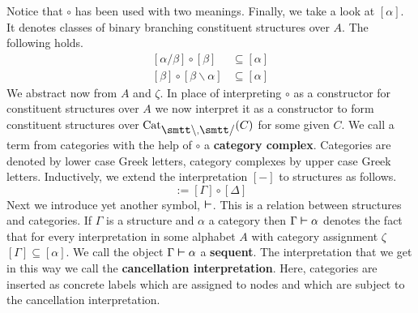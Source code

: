 Notice that $\circ$ has been used with two meanings. Finally, 
we take a look at $[\alpha]$. It denotes classes of binary 
branching constituent structures over $A$. The following holds.
\begin{subequations}
\begin{align}
[\alpha/\beta] \circ [\beta] & 
	\subseteq [\alpha] \\
[\beta] \circ [\beta\backslash \alpha] &
	\subseteq [\alpha]
\end{align}
\end{subequations}
We abstract now from $A$ and $\zeta$. In place of interpreting $\circ$
as a constructor for constituent structures over $A$ we now
interpret it as a constructor to form constituent structures
over $\Cat_{\mbox{\smtt\tb}, \mbox{\smtt\tf}}(C)$ for some given $C$.
We call a term from categories with the help of $\circ$ a 
\textbf{category complex}.
Categories are denoted by lower case Greek letters, category
complexes by upper case Greek letters. Inductively, we extend
the interpretation $[-]$ to structures as follows.
\begin{equation}
[\Gamma \circ \Delta] := [\Gamma] \circ
[\Delta] 
\end{equation}
Next we introduce yet another symbol, $\boldsymbol{\vdash}$. This is a
relation between structures and categories. If $\Gamma$ is
a structure and $\alpha$ a category then $\Gamma \boldsymbol{\vdash} \alpha$
denotes the fact that for every interpretation in some alphabet
$A$ with category assignment $\zeta$ $[\Gamma] \subseteq [\alpha]$. 
We call the object $\Gamma \boldsymbol{\vdash} \alpha$ a \textbf{sequent}. %
The interpretation that we get in this way we call the
\textbf{cancellation interpretation}. %
Here, categories are inserted as concrete labels which are assigned
to nodes and which are subject to the cancellation interpretation.

